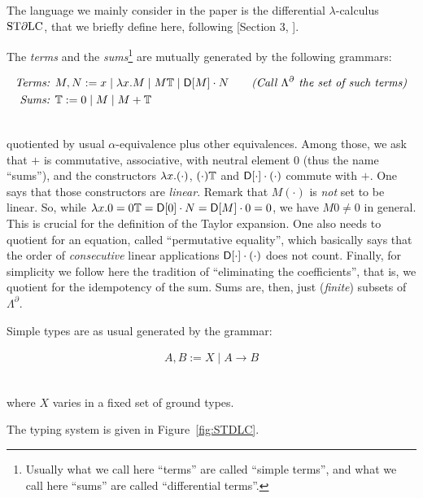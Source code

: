 The language we mainly consider in the paper is the differential $\lambda$-calculus $\mathrm{ST}\partial\mathrm{LC}$, that we briefly define here, following [Section 3, \cite{Manzo2010}].

The \emph{terms} and the \emph{sums}\footnote{Usually what we call here ``terms'' are called ``simple terms'', and what we call here ``sums'' are called ``differential terms''.} are mutually generated by the following grammars:

{
\begin{minipage}{\textwidth}
\begin{align*}
\textit{Terms: } & M,N:= x\mid \lambda x.M \mid M\mathbb{T} \mid \mathsf{D} [M] \cdot N \qquad \textit{(Call $\Lambda^\partial$ the set of such terms)}
\\
\textit{Sums: } & \mathbb{T}:= 0 \mid M \mid M+\mathbb{T}
\end{align*}\end{minipage}}\medskip\\
quotiented by usual $\alpha$-equivalence plus other equivalences.
Among those, we ask that $+$ is commutative, associative, with neutral element $0$ (thus the name ``sums''), and the constructors $\lambda x.(\cdot)$, $(\cdot)\mathbb{T}$ and $\mathsf{D} [\cdot] \cdot (\cdot)$ commute with $+$.
One says that those constructors are \emph{linear}.
Remark that $M(\cdot)$ is \emph{not} set to be linear.
So, while $\lambda x.0=0\mathbb{T}=\mathsf{D} [0] \cdot N=\mathsf{D} [M] \cdot 0=0$, we have $M0\neq0$ in general.
This is crucial for the definition of the Taylor expansion.
One also needs to quotient for an equation, called ``permutative equality'', which basically says that the order of \emph{consecutive} linear applications $\mathsf{D} [\cdot] \cdot (\cdot)$ does not count.
Finally, for simplicity we follow here the tradition of ``eliminating the coefficients'', that is, we quotient for the idempotency of the sum.
Sums are, then, just (\emph{finite}) subsets of $\Lambda^\partial$.

Simple types are as usual generated by the grammar:

{
\begin{minipage}{\textwidth}
\begin{align*}
A,B:= X\mid A\to B
\end{align*}\end{minipage}}\medskip\\
where $X$ varies in a fixed set of ground types.

The typing system is given in Figure~\ref{fig:STDLC}.

